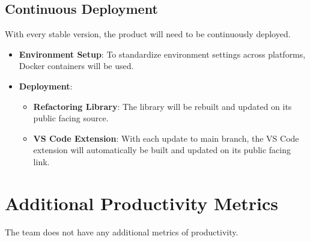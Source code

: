 \documentclass{article}
\begin{document}
\subsection{Continuous Deployment}
With every stable version, the product will need to be continuously deployed.
\begin{itemize}
    \item \textbf{Environment Setup}: To standardize environment settings across platforms, Docker containers will be used.
    \item \textbf{Deployment}:
    \begin{itemize}
        \item \textbf{Refactoring Library}: The library will be rebuilt and updated on its public facing source.
        \item \textbf{VS Code Extension}: With each update to main branch, the VS Code extension will automatically be built and updated on its public facing link.
    \end{itemize}
\end{itemize}

\section{Additional Productivity Metrics}
The team does not have any additional metrics of productivity.
\end{document}
